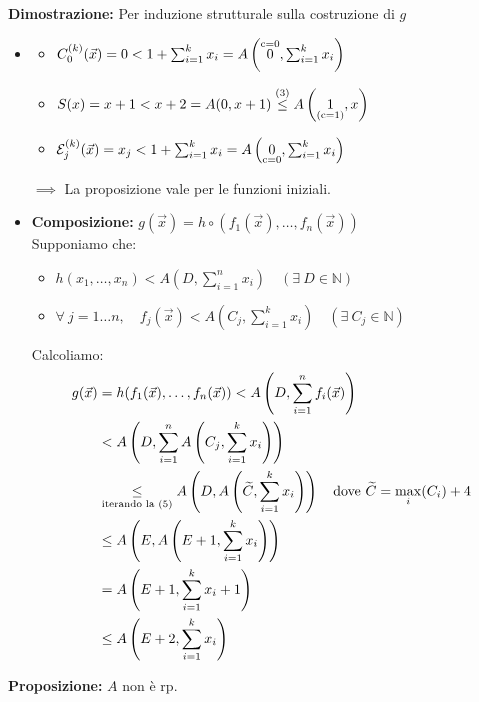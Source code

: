 \textbf{Dimostrazione:} Per induzione strutturale sulla costruzione di $g$
\begin{itemize}
    \item {}
    \begin{itemize}
        \item $C_0^{(k)}(\vec{x}) = 0 < 1 + \sum_{i=1}^{k} x_i = A\left( \overset{\text{\scriptsize c=0}}{0}, \sum_{i=1}^{k} x_i \right)$
        \item $S(x) = x+1 < x+2 = A(0, x+1) \overset{\text{\scriptsize (3)}}{\le} A\left( \underset{\text{\scriptsize (c=1)}}{1}, x \right)$
        \item $\mathcal{E}_j^{(k)}(\vec{x}) = x_j < 1 + \sum_{i=1}^{k} x_i = A\left( \underset{\text{\scriptsize c=0}}{0}, \sum_{i=1}^{k} x_i \right)$
    \end{itemize}
    $\implies$ La proposizione vale per le funzioni iniziali.

    \item \textbf{Composizione:} $g(\vec{x}) = h \circ (f_1(\vec{x}), \dots, f_n(\vec{x}))$ \\
    Supponiamo che:
    \begin{itemize}
        \item $h(x_1, \dots, x_n) < A\left(D, \sum_{i=1}^{n} x_i\right) \quad (\exists\ D \in \mathbb{N})$
        \item $\forall\ j=1\dots n, \quad f_j(\vec{x}) < A\left(C_j, \sum_{i=1}^{k} x_i\right) \quad (\exists\ C_j \in \mathbb{N})$
    \end{itemize}
    Calcoliamo:
    \begin{align*}
    g(\vec{x}) &= h(f_1(\vec{x}), \dots, f_n(\vec{x})) < A\left(D, \sum_{i=1}^{n} f_i(\vec{x})\right) \\
    &< A\left(D, \sum_{i=1}^{n} A\left(C_j, \sum_{i=1}^{k} x_i\right)\right) \\
    &\underset{\text{\scriptsize iterando la (5)}}{\le} A\left(D, A\left(\widetilde{C}, \sum_{i=1}^{k} x_i\right)\right) \quad \text{dove } \widetilde{C} = \max_i(C_i) + 4 \\
    &\le A\left(E, A\left(E+1, \sum_{i=1}^{k} x_i\right)\right) \\
    &= A\left(E+1, \sum_{i=1}^{k} x_i + 1\right) \\
    &\le A\left(E+2, \sum_{i=1}^{k} x_i\right)
    \end{align*}
\end{itemize}

\vspace{0.4cm}
\textbf{Proposizione:} $A$ non è rp.

